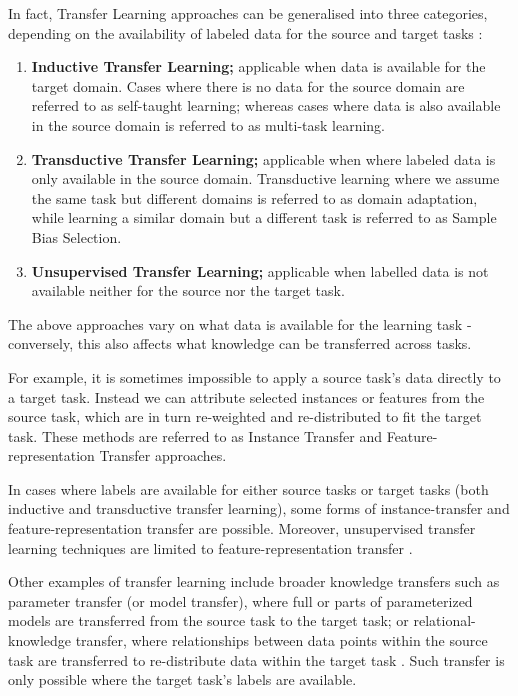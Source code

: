 In fact, Transfer Learning approaches can be generalised into three categories, depending on the availability of labeled data for the source and target tasks \citep{panyang2010}:
\begin{enumerate}  
\item \textbf{Inductive Transfer Learning;} applicable when data is available for the target domain. Cases where there is no data for the source domain are referred to as self-taught learning; whereas cases where data is also available in the source domain is referred to as multi-task learning.

\newpage

\item \textbf{Transductive Transfer Learning;} applicable when where labeled data is only available in the source domain. Transductive learning where we assume the same task but different domains is referred to as domain adaptation, while learning a similar domain but a different task is referred to as Sample Bias Selection.  

\item \textbf{Unsupervised Transfer Learning;} applicable when labelled data is not available neither for the source nor the target task.
\end{enumerate}

The above approaches vary on what data is available for the learning task - conversely, this also affects what knowledge can be transferred across tasks. 

For example, it is sometimes impossible to apply a source task's data directly to a target task. Instead we can attribute selected instances or features from the source task, which are in turn re-weighted and re-distributed to fit the target task. These methods are referred to as Instance Transfer and Feature-representation Transfer approaches.

In cases where labels are available for either source tasks or target tasks (both inductive and transductive transfer learning), some forms of instance-transfer and feature-representation transfer are possible. Moreover, unsupervised transfer learning techniques are limited to feature-representation transfer \citep{panyang2010}. 

Other examples of transfer learning include broader knowledge transfers such as parameter transfer (or model transfer), where full or parts of parameterized models are transferred from the source task to the target task; or relational-knowledge transfer, where relationships between data points within the source task are transferred to re-distribute data within the target task \citep{cook2013}.   Such transfer is only possible where the target task's labels are available.


